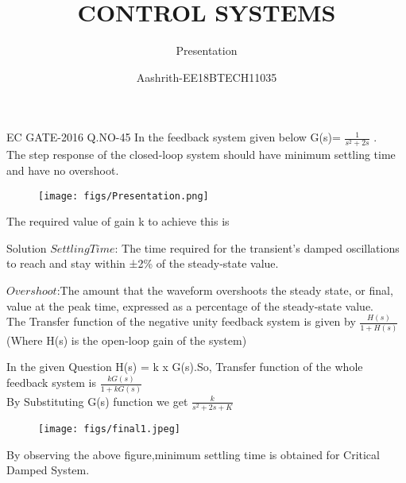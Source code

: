 \documentclass{beamer}
\title{CONTROL SYSTEMS}
\subtitle{Presentation}
\author{Aashrith-EE18BTECH11035}
\begin{document}
\begin{frame}
\titlepage    
\end{frame}


\begin{frame}{EC GATE-2016 Q.NO-45 }
In the feedback system given below G(s)= \(\frac{1}{s^2+2s}\) .\\
The step response of the closed-loop system should have minimum settling time and have no overshoot.

\begin{figure}
    \texttt{[image: figs/Presentation.png]}
\end{figure}

The required value of gain k to achieve this is \underline{\hspace{2cm}}

\end{frame}

\begin{frame}{Solution}
$Settling Time$: The time required for the transient's damped oscillations to
reach and stay within ±2\% of the steady-state value.\vspace{5mm}


$Overshoot$:The amount that the waveform overshoots the steady state, or final, value at the peak time, expressed as a percentage of the steady-state
value.\\
\vspace{5mm}
The Transfer function of the negative unity feedback system is given by \(\frac{H(s)}{1+H(s)}\) (Where H(s) is the open-loop gain of the system) \\
\end{frame}
\begin{frame}
    

In the given Question H(s) = k x G(s).So, Transfer function of the whole feedback system is \(\frac{kG(s)}{1+kG(s)}\) \\
By Substituting G(s) function we get \(\frac{k}{s^2+2s+K}\)
\begin{figure}
    \texttt{[image: figs/final1.jpeg]}

    
\end{figure}

By observing the above figure,minimum settling time is obtained for Critical Damped System.\\
\end{frame}
\end{document}
